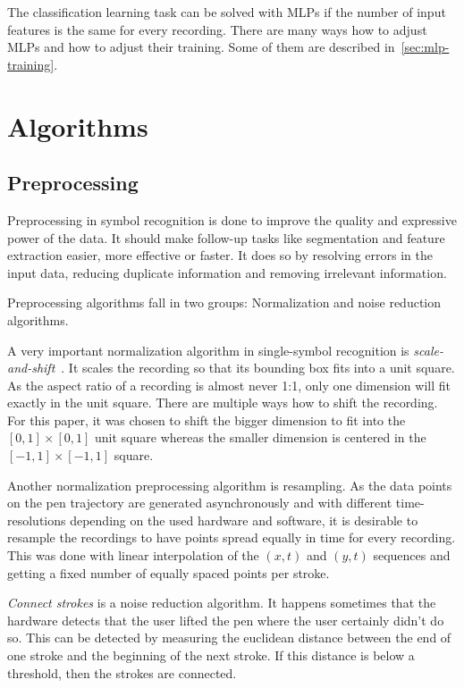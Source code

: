 \documentclass[9pt,technote]{IEEEtran}
\begin{document}
The classification learning task can be solved with \glspl{MLP} if the number
of input features is the same for every recording. There are many ways how to
adjust \glspl{MLP} and how to adjust their training. Some of them are
described in~\cref{sec:mlp-training}.

\section{Algorithms}
\subsection{Preprocessing}\label{sec:preprocessing}
Preprocessing in symbol recognition is done to improve the quality and
expressive power of the data. It should make follow-up tasks like segmentation
and feature extraction easier, more effective or faster. It does so by resolving
errors in the input data, reducing duplicate information and removing irrelevant
information.

Preprocessing algorithms fall in two groups: Normalization and noise
reduction algorithms.

A very important normalization algorithm in single-symbol recognition is
\textit{scale-and-shift}~\cite{Thoma:2014}. It scales the recording so that
its bounding box fits into a unit square. As the aspect ratio of a recording
is almost never 1:1, only one dimension will fit exactly in the unit square.
There are multiple ways how to shift the recording. For this paper, it was
chosen to shift the bigger dimension to fit into the $[0,1] \times [0,1]$ unit
square whereas the smaller dimension is centered in the $[-1,1] \times [-1,1]$
square.

Another normalization preprocessing algorithm is resampling. As the data points
on the pen trajectory are generated asynchronously and with different
time-resolutions depending on the used hardware and software, it is desirable
to resample the recordings to have points spread equally in time for every
recording. This was done with linear interpolation of the $(x,t)$ and $(y,t)$
sequences and getting a fixed number of equally spaced points per stroke.

\textit{Connect strokes} is a noise reduction algorithm. It happens sometimes
that the hardware detects that the user lifted the pen where the user certainly
didn't do so. This can be detected by measuring the euclidean distance between
the end of one stroke and the beginning of the next stroke. If this distance is
below a threshold, then the strokes are connected.
\end{document}
